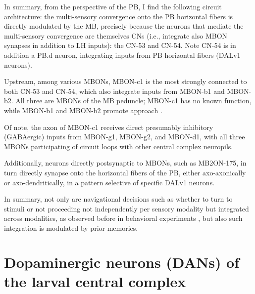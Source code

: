     In summary, from the perspective of the PB, I find the following circuit architecture: the multi-sensory convergence onto the PB horizontal fibers is directly modulated by the MB, precisely because the neurons that mediate the multi-sensory convergence are themselves CNs (i.e., integrate also MBON synapses in addition to LH inputs): the CN-53 and CN-54. %
    Note CN-54 is in addition a PB.d neuron, integrating inputs from PB horizontal fibers (DALv1 neurons).

    Upstream, among various MBONs, MBON-c1 is the most strongly connected to both CN-53 and CN-54, which also integrate inputs from MBON-b1 and MBON-b2. All three are MBONs of the MB peduncle; MBON-c1 has no known function, while MBON-b1 and MBON-b2 promote approach \citep{eschbach2021circuits}.

    Of note, the axon of MBON-c1 receives direct presumably inhibitory (GABAergic) inputs from MBON-g1, MBON-g2, and MBON-d1, with all three MBONs participating of circuit loops with other central complex neuropils.

    Additionally, neurons directly postsynaptic to MBONs, such as MB2ON-175, in turn directly synapse onto the horizontal fibers of the PB, either axo-axonically or axo-dendritically, in a pattern selective of specific DALv1 neurons.

    In summary, not only are navigational decisions such as whether to turn to stimuli or not proceeding not independently per sensory modality but integrated across modalities, as observed before in behavioral experiments \citep{gepner2015computations}, but also such integration is modulated by prior memories.


\section{Dopaminergic neurons (DANs) of the larval central complex}
    

